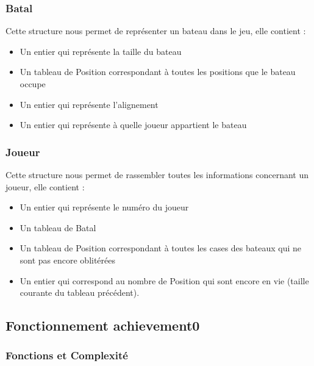 \subsubsection{Batal}

Cette structure nous permet de représenter un bateau dans le jeu, elle
contient :
\begin{itemize}
\item Un entier qui représente la taille du bateau
\item Un tableau de Position correspondant à toutes les positions
  que le bateau occupe
\item Un entier qui représente l'alignement 
\item Un entier qui représente à quelle joueur appartient le bateau
\end{itemize}

\subsubsection{Joueur}

Cette structure nous permet de rassembler toutes les informations
concernant un joueur, elle contient :
\begin{itemize}
\item Un entier qui représente le numéro du joueur
\item Un tableau de Batal
\item Un tableau de Position correspondant à toutes les cases des
  bateaux qui ne sont pas encore oblitérées
\item Un entier qui correspond au nombre de Position qui sont encore
  en vie (taille courante du tableau précédent).
\end{itemize}

\subsection{Fonctionnement achievement0}

\subsubsection{Fonctions et Complexité}

